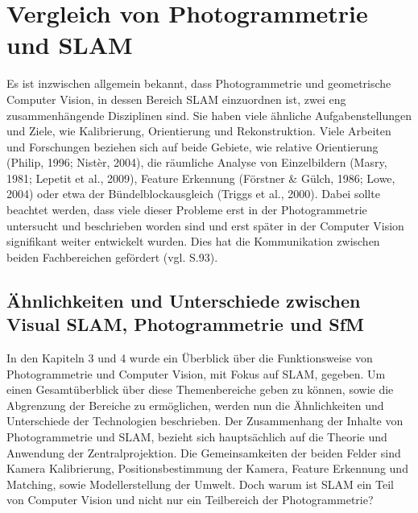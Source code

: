 \chapter{Vergleich von Photogrammetrie und SLAM}

Es ist inzwischen allgemein bekannt, dass Photogrammetrie und geometrische Computer Vision, in dessen Bereich SLAM einzuordnen ist, zwei eng zusammenhängende Disziplinen sind. Sie haben viele ähnliche Aufgabenstellungen und Ziele, wie Kalibrierung, Orientierung und Rekonstruktion. Viele Arbeiten und Forschungen beziehen sich auf beide Gebiete, wie relative Orientierung (Philip, 1996; Nistèr, 2004), die räumliche Analyse von Einzelbildern (Masry, 1981; Lepetit et al., 2009), Feature Erkennung  (Förstner \& Gülch, 1986; Lowe, 2004) oder etwa der Bündelblockausgleich  (Triggs et al., 2000). Dabei sollte beachtet werden, dass viele dieser Probleme erst in der Photogrammetrie untersucht und beschrieben worden sind und erst später in der Computer Vision signifikant weiter entwickelt wurden. Dies hat die Kommunikation zwischen beiden Fachbereichen gefördert (vgl. \cite{ph_vs_cv} S.93).


\section{Ähnlichkeiten und Unterschiede zwischen Visual SLAM, Photogrammetrie und SfM}

In den Kapiteln 3 und 4 wurde ein Überblick über die Funktionsweise von Photogrammetrie und Computer Vision, mit Fokus auf SLAM, gegeben. Um einen Gesamtüberblick über diese Themenbereiche geben zu können, sowie die Abgrenzung der Bereiche zu ermöglichen, werden nun die Ähnlichkeiten und Unterschiede der Technologien beschrieben. Der Zusammenhang der Inhalte von Photogrammetrie und SLAM, bezieht sich hauptsächlich auf die Theorie und Anwendung der Zentralprojektion. Die Gemeinsamkeiten der beiden Felder sind Kamera Kalibrierung, Positionsbestimmung der Kamera, Feature Erkennung und Matching, sowie Modellerstellung der Umwelt. Doch warum ist SLAM ein Teil von Computer Vision und nicht nur ein Teilbereich der Photogrammetrie?

